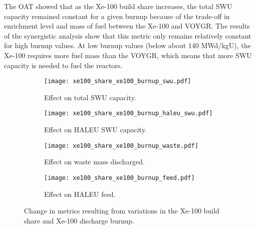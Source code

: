 The \gls{OAT} showed that as the Xe-100 build share increases, the 
total \gls{SWU} capacity remained constant for a given burnup because 
of the trade-off in enrichment level and mass of fuel between the Xe-100 
and VOYGR. The results of the synergistic analysis show that this 
metric only remains relatively constant for high burnup values. At 
low burnup values (below about 140 MWd/kgU), the Xe-100 requires more 
fuel mass than the VOYGR, which means that more \gls{SWU} capacity 
is needed to fuel the reactors. 

\begin{figure}    
    \begin{subfigure}[t]{0.48\textwidth}
        \centering
        \texttt{[image: xe100\_share\_xe100\_burnup\_swu.pdf]}
        \caption{Effect on total SWU capacity.}
        \label{fig:xe100_share_xe100_burnup_swu}
    \end{subfigure}
    \hfill
    \begin{subfigure}[t]{0.48\textwidth}
        \centering
        \texttt{[image: xe100\_share\_xe100\_burnup\_haleu\_swu.pdf]}
        \caption{Effect on HALEU SWU capacity.}
        \label{fig:xe100_share_xe100_burnup_haleu_swu}
    \end{subfigure}
    
    \begin{subfigure}[t]{0.48\textwidth}
        \centering
        \texttt{[image: xe100\_share\_xe100\_burnup\_waste.pdf]}
        \caption{Effect on waste mass discharged.}
        \label{fig:xe100_share_xe100_burnup_waste}
    \end{subfigure}
    \hfill
    \begin{subfigure}[t]{0.48\textwidth}
        \centering
        \texttt{[image: xe100\_share\_xe100\_burnup\_feed.pdf]}
        \caption{Effect on HALEU feed.}
        \label{fig:xe100_share_xe100_burnup_feed}
    \end{subfigure}
    \caption{Change in metrics resulting from variations in the 
    Xe-100 build share and Xe-100 discharge burnup.}
    \label{fig:xe100_share_xe100_burnup}
\end{figure}

